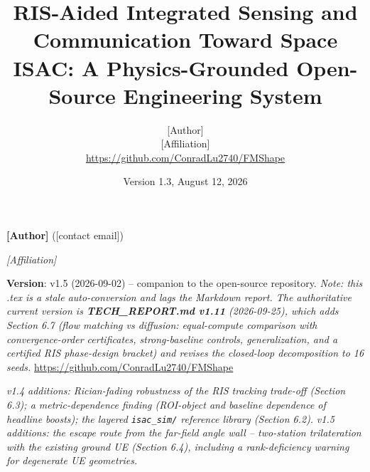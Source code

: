 \documentclass[11pt]{article}
\title{RIS-Aided Integrated Sensing and Communication Toward Space ISAC: A Physics-Grounded Open-Source Engineering System}
\author{[Author]\\[2pt] \small [Affiliation]\\ \small\url{https://github.com/ConradLu2740/FMShape}}
\date{Version 1.3, August 12, 2026}
\begin{document}
\maketitle

\textbf{[Author]} ([contact email])

\textit{[Affiliation]}

\textbf{Version}: v1.5 (2026-09-02) -- companion to the open-source repository.
\textit{Note: this .tex is a stale auto-conversion and lags the Markdown report. The authoritative current
version is \textbf{TECH\_REPORT.md v1.11} (2026-09-25), which adds Section 6.7 (flow matching vs diffusion:
equal-compute comparison with convergence-order certificates, strong-baseline controls, generalization, and a
certified RIS phase-design bracket) and revises the closed-loop decomposition to 16 seeds.}
\href{https://github.com/ConradLu2740/FMShape}{https://github.com/ConradLu2740/FMShape}

\textit{v1.4 additions: Rician-fading robustness of the RIS tracking trade-off (Section 6.3); a metric-dependence finding (ROI-object and baseline dependence of headline boosts); the layered \texttt{isac\_sim/} reference library (Section 6.2).}
\textit{v1.5 additions: the escape route from the far-field angle wall -- two-station trilateration with the existing ground UE (Section 6.4), including a rank-deficiency warning for degenerate UE geometries.}
\end{document}
